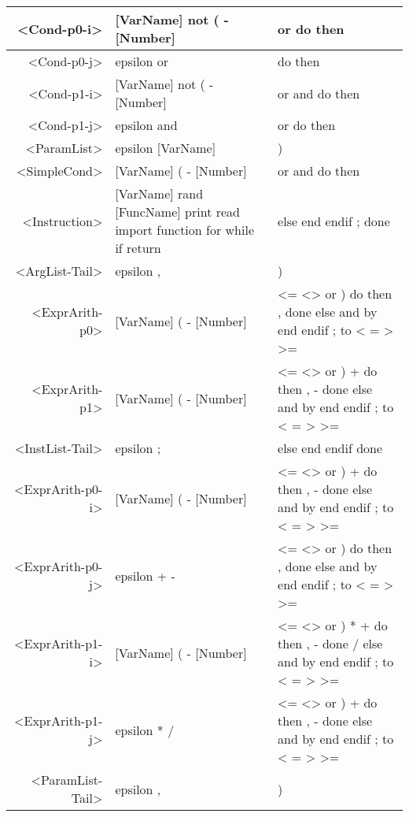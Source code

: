 \begin{longtable}{r p{7cm} p{7cm}}
<Cond-p0-i> & [VarName] not ( - [Number]  & or do then \\ \hline
<Cond-p0-j> & epsilon or  & do then \\ \hline
<Cond-p1-i> & [VarName] not ( - [Number]  & or and do then \\ \hline
<Cond-p1-j> & epsilon and  & or do then \\ \hline
<ParamList> & epsilon [VarName]  & ) \\ \hline
<SimpleCond> & [VarName] ( - [Number]  & or and do then \\ \hline
<Instruction> & [VarName] rand [FuncName] print read import function for while if return  & else end endif ; done \\ \hline
<ArgList-Tail> & epsilon ,  & ) \\ \hline
<ExprArith-p0> & [VarName] ( - [Number]  & <= <> or ) do then , done else and by end endif ; to < = > >= \\ \hline
<ExprArith-p1> & [VarName] ( - [Number]  & <= <> or ) + do then , - done else and by end endif ; to < = > >= \\ \hline
<InstList-Tail> & epsilon ;  & else end endif done \\ \hline
<ExprArith-p0-i> & [VarName] ( - [Number]  & <= <> or ) + do then , - done else and by end endif ; to < = > >= \\ \hline
<ExprArith-p0-j> & epsilon + -  & <= <> or ) do then , done else and by end endif ; to < = > >= \\ \hline
<ExprArith-p1-i> & [VarName] ( - [Number]  & <= <> or ) * + do then , - done / else and by end endif ; to < = > >= \\ \hline
<ExprArith-p1-j> & epsilon * /  & <= <> or ) + do then , - done else and by end endif ; to < = > >= \\ \hline
<ParamList-Tail> & epsilon ,  & ) 
\end{longtable}

